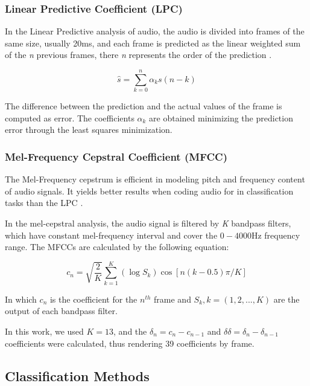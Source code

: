 \documentclass[12pt]{article}
\begin{document}
\subsubsection{Linear Predictive Coefficient (LPC)}\label{class:lpc}

In the Linear Predictive analysis of audio, the audio is divided into frames of the same size, usually 20ms, and each frame is predicted as the linear weighted sum of the \textit{n} previous frames, there \textit{n} represents the order of the prediction \cite{Rabiner:1993:FSR:153687}. 

\begin{equation}
	\hat{s} = \sum_{k=0}^{n} \alpha_ks(n-k)
	\label{eq:lpc}
\end{equation}


The difference between the prediction and the actual values of the frame is computed as error. The coefficients $\alpha_k$ are obtained minimizing the prediction error through the least squares minimization.


\subsubsection{Mel-Frequency Cepstral Coefficient (MFCC)} \label{class:mfcc}

The Mel-Frequency cepstrum is efficient in modeling pitch and frequency content of audio signals. It yields better results when coding audio for in classification tasks than the LPC \cite{li2001classification}.

In the mel-cepstral analysis, the audio signal is filtered by \textit{K} bandpass filters, which have constant mel-frequency interval and cover the $0-4000$Hz frequency range. The MFCCs are calculated by the following equation:

\begin{equation}
	c_n = \sqrt{\frac{2}{K}} \sum_{k=1}^{K} (\log S_k) \cos [n(k-0.5)\pi/K]
	\label{eq:mfcc}
\end{equation}

In which $c_n$ is the coefficient for the $n^{th}$ frame and $S_k, k=(1,2,...,K)$ are the output of each bandpass filter.

In this work, we used $K = 13$, and the $\delta_n = c_n - c_{n-1}$ and $\delta\delta = \delta_n - \delta_{n-1} $ coefficients were calculated, thus rendering 39 coefficients by frame.

\subsection{Classification Methods} \label{class:meth}
\end{document}
